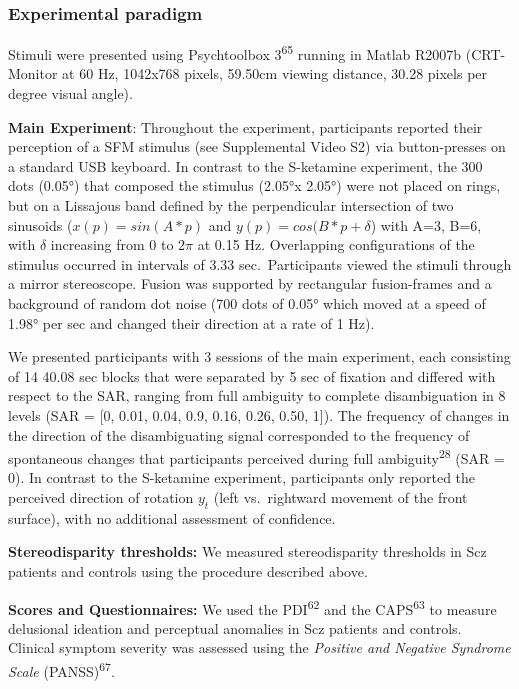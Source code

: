 \documentclass[
]{article}
\begin{document}
\subsubsection{Experimental paradigm}\label{experimental-paradigm-1}

Stimuli were presented using Psychtoolbox 3\textsuperscript{65} running
in Matlab R2007b (CRT-Monitor at 60 Hz, 1042x768 pixels, 59.50cm viewing
distance, 30.28 pixels per degree visual angle).

\textbf{Main Experiment}: Throughout the experiment, participants
reported their perception of a SFM stimulus (see Supplemental Video S2)
via button-presses on a standard USB keyboard. In contrast to the
S-ketamine experiment, the 300 dots (0.05°) that composed the stimulus
(2.05°x 2.05°) were not placed on rings, but on a Lissajous band defined
by the perpendicular intersection of two sinusoids (\(x(p) = sin(A*p)\)
and \(y(p) = cos(B*p + \delta\)) with A=3, B=6, with \(\delta\)
increasing from 0 to \(2\pi\) at 0.15 Hz. Overlapping configurations of
the stimulus occurred in intervals of 3.33 sec.~Participants viewed the
stimuli through a mirror stereoscope. Fusion was supported by
rectangular fusion-frames and a background of random dot noise (700 dots
of 0.05° which moved at a speed of 1.98° per sec and changed their
direction at a rate of 1 Hz).

We presented participants with 3 sessions of the main experiment, each
consisting of 14 40.08 sec blocks that were separated by 5 sec of
fixation and differed with respect to the SAR, ranging from full
ambiguity to complete disambiguation in 8 levels (SAR = {[}0, 0.01,
0.04, 0.9, 0.16, 0.26, 0.50, 1{]}). The frequency of changes in the
direction of the disambiguating signal corresponded to the frequency of
spontaneous changes that participants perceived during full
ambiguity\textsuperscript{28} (SAR = 0). In contrast to the S-ketamine
experiment, participants only reported the perceived direction of
rotation \(y_t\) (left vs.~rightward movement of the front surface),
with no additional assessment of confidence.

\textbf{Stereodisparity thresholds:} We measured stereodisparity
thresholds in Scz patients and controls using the procedure described
above.

\textbf{Scores and Questionnaires:} We used the PDI\textsuperscript{62}
and the CAPS\textsuperscript{63} to measure delusional ideation and
perceptual anomalies in Scz patients and controls. Clinical symptom
severity was assessed using the \emph{Positive and Negative Syndrome
Scale} (PANSS)\textsuperscript{67}.
\end{document}
